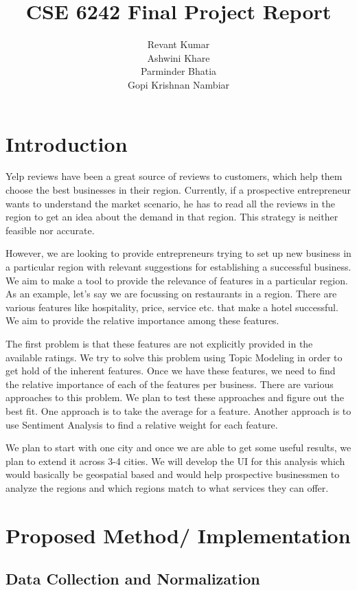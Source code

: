 \documentclass[12pt]{article} %
\title{CSE 6242 Final Project Report}
\author{
Revant Kumar\\
\And
Ashwini Khare\\
\And
Parminder Bhatia\\
\And
Gopi Krishnan Nambiar
}
\begin{document}
\maketitle

\section{Introduction}

Yelp reviews have been a great source of reviews to customers, which help them choose the best businesses in their region. Currently, if a prospective entrepreneur wants to understand the market scenario, he has to read all the reviews in the region to get an idea about the demand in that region. This strategy is neither feasible nor accurate. 

However, we are looking to provide entrepreneurs trying to set up new business in a particular region with relevant suggestions for establishing a successful business. We aim to make a tool to provide the relevance of features in a particular region. As an example, let's say we are focussing on restaurants in a region. There are various features like hospitality, price, service etc. that make a hotel successful. We aim to provide the relative importance among these features. 

The first problem is that these features are not explicitly provided in the available ratings. We try to solve this problem using Topic Modeling in order to get hold of the inherent features. Once we have these features, we need to find the relative importance of each of the features per business. There are various approaches to this problem. We plan to test these approaches and figure out the best fit. One approach is to take the average for a feature. Another approach is to use Sentiment Analysis to find a relative weight for each feature. 

We plan to start with one city and once we are able to get some useful results, we plan to extend it across 3-4 cities. We will develop the UI for this analysis which would basically be geospatial based and would help prospective businessmen to analyze the regions and which regions match to what services they can offer.

\section{Proposed Method/ Implementation}

\subsection{Data Collection and Normalization}
\end{document}

